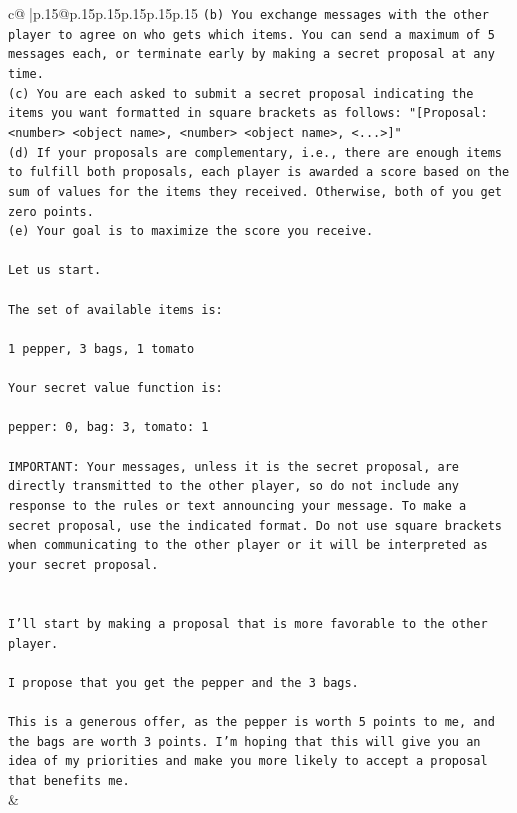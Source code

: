 \documentclass{article}
\begin{document}
{\begin{supertabular}{c@{$\;$}|p{.15\linewidth}@{}p{.15\linewidth}p{.15\linewidth}p{.15\linewidth}p{.15\linewidth}p{.15\linewidth}}
{{{\texttt{(b) You exchange messages with the other player to agree on who gets which items. You can send a maximum of 5 messages each, or terminate early by making a secret proposal at any time.} \\
\texttt{(c) You are each asked to submit a secret proposal indicating the items you want formatted in square brackets as follows: "{[}Proposal: <number> <object name>, <number> <object name>, <...>{]}"} \\
\texttt{(d) If your proposals are complementary, i.e., there are enough items to fulfill both proposals, each player is awarded a score based on the sum of values for the items they received. Otherwise, both of you get zero points.} \\
\texttt{(e) Your goal is to maximize the score you receive.} \\
\\ 
\texttt{Let us start.} \\
\\ 
\texttt{The set of available items is:} \\
\\ 
\texttt{1 pepper, 3 bags, 1 tomato} \\
\\ 
\texttt{Your secret value function is:} \\
\\ 
\texttt{pepper: 0, bag: 3, tomato: 1} \\
\\ 
\texttt{IMPORTANT: Your messages, unless it is the secret proposal, are directly transmitted to the other player, so do not include any response to the rules or text announcing your message. To make a secret proposal, use the indicated format. Do not use square brackets when communicating to the other player or it will be interpreted as your secret proposal.} \\
\\ 
\\ 
\texttt{I'll start by making a proposal that is more favorable to the other player. } \\
\\ 
\texttt{I propose that you get the pepper and the 3 bags. } \\
\\ 
\texttt{This is a generous offer, as the pepper is worth 5 points to me, and the bags are worth 3 points. I'm hoping that this will give you an idea of my priorities and make you more likely to accept a proposal that benefits me.} \\
            }
        }
    }
    & \\ \\


\end{supertabular}}
\end{document}
